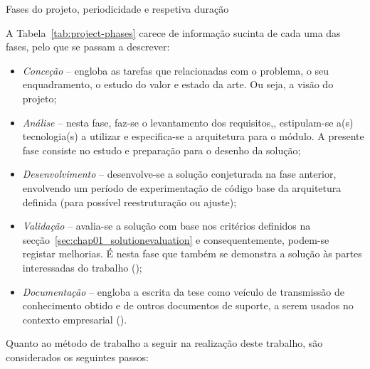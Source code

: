\begin{table}[!ht]
\caption{Fases do projeto, periodicidade e respetiva duração}
\label{tab:project-phases}
\centering
\resizebox{\textwidth}{!}{}
\end{table}

A Tabela~\ref{tab:project-phases} carece de informação sucinta de cada uma das fases, pelo que se passam a descrever:

\begin{itemize}
    \item
    {
        \textit{Conceção} -- engloba as tarefas que relacionadas com o problema, o seu enquadramento, o estudo do valor e estado da arte. Ou seja, a visão do projeto;
    }
    \item
    {
        \textit{Análise} -- nesta fase, faz-se o levantamento dos requisitos,, estipulam-se a(s) tecnologia(s) a utilizar e especifica-se a arquitetura para o módulo. A presente fase consiste no estudo e preparação para o desenho da solução; 
    }
    \item
    {
        \textit{Desenvolvimento} -- desenvolve-se a solução conjeturada na fase anterior, envolvendo um período de experimentação de código base da arquitetura definida (para possível reestruturação ou ajuste);
    }
    \item
    {
        \textit{Validação} -- avalia-se a solução com base nos critérios definidos na secção~\ref{sec:chap01_solutionevaluation} e consequentemente, podem-se registar melhorias. É nesta fase que também se demonstra a solução às partes interessadas do trabalho ();
    }
    \item
    {
        \textit{Documentação} -- engloba a escrita da tese como veículo de transmissão de conhecimento obtido e de outros documentos de suporte, a serem usados no contexto empresarial ().
    }
\end{itemize}

Quanto ao método de trabalho a seguir na realização deste trabalho, são considerados os seguintes passos:

